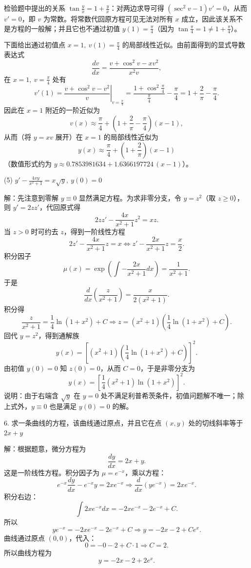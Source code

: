 检验题中提出的关系 \(\tan\frac{y}{x}=1+\frac{y}{x}\)：对两边求导可得 \((\sec^{2}v-1)v'=0\)，从而 \(v'=0\)，即 \(v\) 为常数。将常数代回原方程可见无法对所有 \(x\) 成立，因此该关系不是方程的一般解；并且它也不通过初值 \(y(1)=\frac{\pi}{4}\)（因为 \(\tan\frac{\pi}{4}=1\ne1+\frac{\pi}{4}\)）。

下面给出通过初值点 \(x=1,\ v(1)=\frac{\pi}{4}\) 的局部线性近似。由前面得到的显式导数表达式
\[ \frac{dv}{dx}=\frac{v+\cos^{2}v-xv^{2}}{x^{2}v}, \]
在 \(x=1,\ v=\frac{\pi}{4}\) 处有
\[ v'(1)=\left.\frac{v+\cos^{2}v-v^{2}}{v}\right|_{v=\frac{\pi}{4}}=\frac{1+\cos^{2}\frac{\pi}{4}}{\frac{\pi}{4}}-\frac{\pi}{4}=1+\frac{2}{\pi}-\frac{\pi}{4}. \]
因此在 \(x=1\) 附近的一阶近似为
\[ v(x)\approx\frac{\pi}{4}+\left(1+\frac{2}{\pi}-\frac{\pi}{4}\right)(x-1), \]
从而（将 \(y=xv\) 展开）在 \(x=1\) 的局部线性近似为
\[ y(x)\approx\frac{\pi}{4}+\left(1+\frac{2}{\pi}\right)(x-1) \]
（数值形式约为 \(y\approx0.7853981634+1.6366197724\,(x-1)\)）。

(5) \(y'-\frac{4xy}{x^{2}+1}=x\sqrt{y},\ y(0)=0\)

解：先注意到零解 \(y\equiv0\) 显然满足方程。为求非零分支，令 \(y=z^{2}\)（取 \(z\ge0\)），则 \(y'=2zz'\)，代回原式得
\[ 2zz'-\frac{4x}{x^{2}+1}z^{2}=xz. \]
当 \(z>0\) 时可约去 \(z\)，得到一阶线性方程
\[ 2z'-\frac{4x}{x^{2}+1}z=x\iff z'-\frac{2x}{x^{2}+1}z=\frac{x}{2}. \]
积分因子
\[ \mu(x)=\exp\left(\int-\frac{2x}{x^{2}+1}dx\right)=\frac{1}{x^{2}+1}. \]
于是
\[ \frac{d}{dx}\left(\frac{z}{x^{2}+1}\right)=\frac{x}{2(x^{2}+1)}. \]
积分得
\[ \frac{z}{x^{2}+1}=\frac{1}{4}\ln(1+x^{2})+C\Longrightarrow z=(x^{2}+1)\left(\frac{1}{4}\ln(1+x^{2})+C\right). \]
回代 \(y=z^{2}\)，得到通解族
\[ y(x)=\left[(x^{2}+1)\left(\frac{1}{4}\ln(1+x^{2})+C\right)\right]^{2}. \]
由初值 \(y(0)=0\) 知 \(z(0)=0\)，从而 \(C=0\)，于是非零分支为
\[ y(x)=\left[\frac{1}{4}(x^{2}+1)\ln(1+x^{2})\right]^{2}. \]
说明：由于右端含 \(\sqrt{y}\) 在 \(y=0\) 处不满足利普希茨条件，初值问题解不唯一；除上式外，\(y\equiv0\) 也是满足 \(y(0)=0\) 的解。

6. 求一条曲线的方程，该曲线通过原点，并且它在点 \((x,y)\) 处的切线斜率等于 \(2x+y\)

解：根据题意，微分方程为
\[ \frac{dy}{dx}=2x+y. \]
这是一阶线性方程。积分因子为 \(\mu=e^{-x}\)，乘以方程：
\[ e^{-x}\frac{dy}{dx}-e^{-x}y=2xe^{-x}\Rightarrow\frac{d}{dx}\left(ye^{-x}\right)=2xe^{-x}. \]
积分右边：
\[ \int2xe^{-x}dx=-2xe^{-x}-2e^{-x}+C. \]
所以
\[ ye^{-x}=-2xe^{-x}-2e^{-x}+C\Rightarrow y=-2x-2+Ce^{x}. \]
曲线通过原点 \((0,0)\)，代入：
\[ 0=-0-2+C\cdot1\Rightarrow C=2. \]
所以曲线方程为
\[ y=-2x-2+2e^{x}. \]

